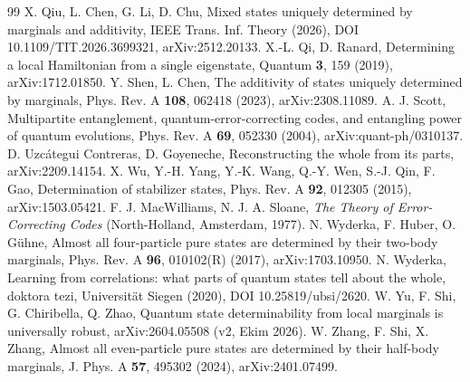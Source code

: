\documentclass[aps,pra,onecolumn,superscriptaddress,nofootinbib,longbibliography,10pt]{revtex4-2}
\theoremstyle{definition}
\begin{document}
\begin{thebibliography}{99}
 X. Qiu, L. Chen, G. Li, D. Chu, Mixed states uniquely determined by marginals and additivity, IEEE Trans. Inf. Theory (2026), DOI 10.1109/TIT.2026.3699321, arXiv:2512.20133.
 X.-L. Qi, D. Ranard, Determining a local Hamiltonian from a single eigenstate, Quantum \textbf{3}, 159 (2019), arXiv:1712.01850.
 Y. Shen, L. Chen, The additivity of states uniquely determined by marginals, Phys. Rev. A \textbf{108}, 062418 (2023), arXiv:2308.11089.
 A. J. Scott, Multipartite entanglement, quantum-error-correcting codes, and entangling power of quantum evolutions, Phys. Rev. A \textbf{69}, 052330 (2004), arXiv:quant-ph/0310137.
 D. Uzcátegui Contreras, D. Goyeneche, Reconstructing the whole from its parts, arXiv:2209.14154.
 X. Wu, Y.-H. Yang, Y.-K. Wang, Q.-Y. Wen, S.-J. Qin, F. Gao, Determination of stabilizer states, Phys. Rev. A \textbf{92}, 012305 (2015), arXiv:1503.05421.
 F. J. MacWilliams, N. J. A. Sloane, \emph{The Theory of Error-Correcting Codes} (North-Holland, Amsterdam, 1977).
 N. Wyderka, F. Huber, O. Gühne, Almost all four-particle pure states are determined by their two-body marginals, Phys. Rev. A \textbf{96}, 010102(R) (2017), arXiv:1703.10950.
 N. Wyderka, Learning from correlations: what parts of quantum states tell about the whole, doktora tezi, Universität Siegen (2020), DOI 10.25819/ubsi/2620.
 W. Yu, F. Shi, G. Chiribella, Q. Zhao, Quantum state determinability from local marginals is universally robust, arXiv:2604.05508 (v2, Ekim 2026).
 W. Zhang, F. Shi, X. Zhang, Almost all even-particle pure states are determined by their half-body marginals, J. Phys. A \textbf{57}, 495302 (2024), arXiv:2401.07499.
\end{thebibliography}
\end{document}

